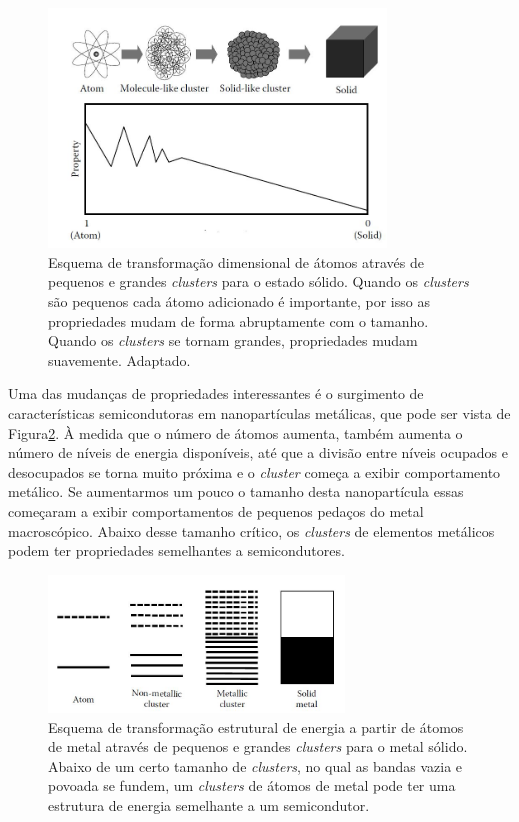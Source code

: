\begin{figure}
  \centering
  \includegraphics[width=0.8\textwidth]{images/clusters/atomo_cluste_solido}
  \caption{Esquema de transformação dimensional de átomos através de pequenos e grandes \textit{clusters} para o estado sólido. Quando os \textit{clusters} são pequenos cada átomo adicionado é importante, por isso as propriedades mudam
de forma abruptamente com o tamanho. Quando os \textit{clusters} se tornam grandes,
propriedades mudam suavemente\cite{cap06_Nanophysics}. Adaptado.  }
  \label{fig:transicao_cluster_solido}
\end{figure}

Uma das mudanças de propriedades interessantes é o surgimento de características semicondutoras em nanopartículas metálicas, que pode ser vista de Figura\ref{fig:carac_metal}. À medida que o número de átomos aumenta, também aumenta o número de níveis de energia disponíveis, até que a divisão entre níveis ocupados e desocupados se torna muito próxima e o \textit{cluster} começa a exibir comportamento metálico. Se aumentarmos um pouco o tamanho desta nanopartícula essas começaram a exibir comportamentos de pequenos pedaços do metal macroscópico. Abaixo desse tamanho crítico, os \textit{clusters} de elementos metálicos podem ter propriedades semelhantes a semicondutores.


\begin{figure}
  \centering
  \includegraphics[width=0.7\textwidth]{images/clusters/carac_metal}
  \caption{ Esquema de transformação estrutural de energia a partir de átomos de metal através de pequenos e grandes \textit{clusters} para o metal sólido. Abaixo de um certo tamanho de \textit{clusters}, no qual as bandas vazia e povoada se fundem, um \textit{clusters} de átomos de metal pode ter uma estrutura de energia semelhante a um semicondutor.\cite{dissertacao_anderson}  }
  \label{fig:carac_metal}
\end{figure}



